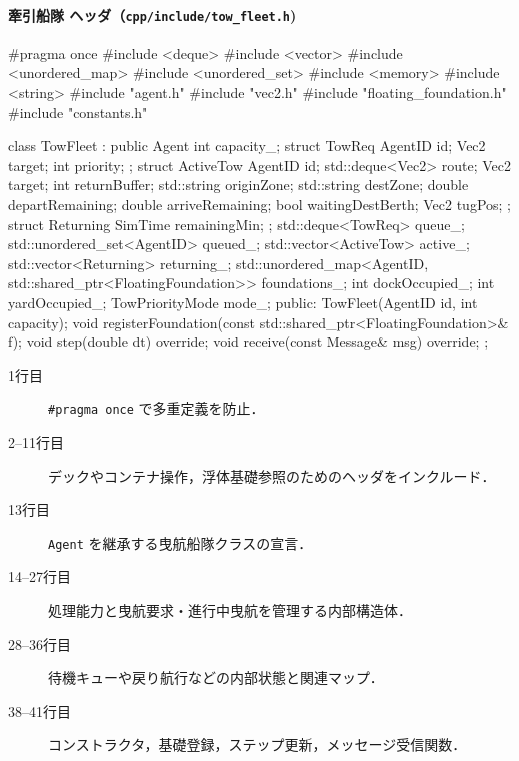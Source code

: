\documentclass[10pt,letterpaper]{jsarticle}
\begin{document}
\paragraph{牽引船隊 ヘッダ（\texttt{cpp/include/tow\_fleet.h})}
\begin{cppcode}
#pragma once
#include <deque>
#include <vector>
#include <unordered_map>
#include <unordered_set>
#include <memory>
#include <string>
#include "agent.h"
#include "vec2.h"
#include "floating_foundation.h"
#include "constants.h"

class TowFleet : public Agent {
    int capacity_;
    struct TowReq { AgentID id; Vec2 target; int priority; };
    struct ActiveTow {
        AgentID id;
        std::deque<Vec2> route;
        Vec2 target;
        int returnBuffer;
        std::string originZone;
        std::string destZone;
        double departRemaining;
        double arriveRemaining;
        bool waitingDestBerth;
        Vec2 tugPos;
    };
    struct Returning { SimTime remainingMin; };
    std::deque<TowReq> queue_;
    std::unordered_set<AgentID> queued_;
    std::vector<ActiveTow> active_;
    std::vector<Returning> returning_;
    std::unordered_map<AgentID, std::shared_ptr<FloatingFoundation>> foundations_;
    int dockOccupied_;
    int yardOccupied_;
    TowPriorityMode mode_;
public:
    TowFleet(AgentID id, int capacity);
    void registerFoundation(const std::shared_ptr<FloatingFoundation>& f);
    void step(double dt) override;
    void receive(const Message& msg) override;
};
\end{cppcode}
\begin{description}
  \item[1行目] \lstinline|#pragma once| で多重定義を防止．
  \item[2--11行目] デックやコンテナ操作，浮体基礎参照のためのヘッダをインクルード．
  \item[13行目] \texttt{Agent} を継承する曳航船隊クラスの宣言．
  \item[14--27行目] 処理能力と曳航要求・進行中曳航を管理する内部構造体．
  \item[28--36行目] 待機キューや戻り航行などの内部状態と関連マップ．
  \item[38--41行目] コンストラクタ，基礎登録，ステップ更新，メッセージ受信関数．
\end{description}
\end{document}
